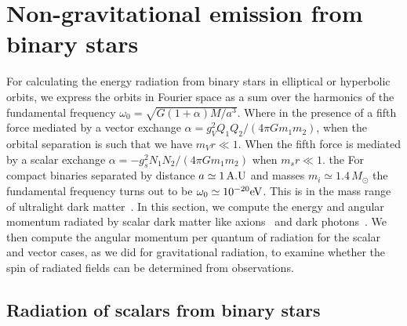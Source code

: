 \documentclass[aps,prd]{revtex4-2}
\begin{document}

\section{Non-gravitational emission from binary stars}\label{Sec:non_gravity_rad}

For calculating the energy radiation from binary stars in elliptical or hyperbolic orbits, we express the orbits in Fourier space as a sum over the harmonics of the fundamental frequency $\omega_0=\sqrt{G(1+\alpha)M/a^3}$. Where in the presence of a fifth force mediated by a vector exchange $\alpha = g_{V}^2 Q_{1} Q_{2}/(4\pi Gm_{1} m_{2})$, when the orbital separation is such that we have $m_{V} r \ll 1$. When the fifth force is mediated by a scalar exchange $\alpha=- g_s^2 N_1 N_2/(4 \pi G m_1 m_2)$ when $m_s r \ll 1$.  the For compact binaries separated by distance $a\simeq 1\, {\rm A.U}$ and masses $m_i\simeq 1.4\, M_\odot$ the fundamental frequency turns out to be $\omega_0 \simeq 10^{-20} {\rm eV}$. This is in the mass range of ultralight dark matter~\cite{Hu:2000ke, Hui:2016ltb, Schive:2025bcm}. In this section, we compute the energy and angular momentum radiated by scalar dark matter like axions~\cite{KumarPoddar:2019jxe} and dark photons~\cite{KumarPoddar:2019jxe}. We then compute the angular momentum per quantum of radiation for the scalar and vector cases, as we did for gravitational radiation, to examine whether the spin of radiated fields can be determined from observations.

\subsection{Radiation of scalars from binary stars}
\end{document}
